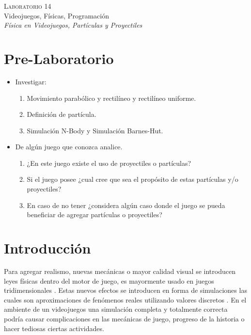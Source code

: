 \begin{center}
\textsc{\Large Laboratorio 14}~\\
{\large Videojuegos, Físicas, Programación}~\\
\emph{Física en Videojuegos, Partículas y Proyectiles}
\end{center}

\section{Pre-Laboratorio}
\begin{itemize}
\item Investigar:
\begin{enumerate}
  \item Movimiento parabólico y rectilíneo y rectilíneo uniforme.
  \item Definición de partícula.
  \item Simulación N-Body y Simulación Barnes-Hut.
\end{enumerate}
\item De algún juego que conozca analice.
\begin{enumerate}
  \item ¿En este juego existe el uso de proyectiles o partículas? 
  \item Si el juego posee ¿cual cree que sea el propósito de estas partículas y/o proyectiles?
  \item En caso de no tener ¿considera algún caso donde el juego se pueda beneficiar de agregar partículas o proyectiles?
\end{enumerate}
\end{itemize}

\section{Introducción}
Para agregar realismo, nuevas mecánicas o mayor calidad visual se introducen leyes físicas dentro del motor de juego, es mayormente usado en juegos tridimensionales \cite[p.~325]{jenkinscreatinggames}. Estas nuevos efectos se introducen en forma de simulaciones las cuales son aproximaciones de fenómenos reales utilizando valores discretos \cite{ian_gamephysics}. En el ambiente de un videojuegos una simulación completa y totalmente correcta podría causar complicaciones en las mecánicas de juego, progreso de la historia o hacer tediosas ciertas actividades.

